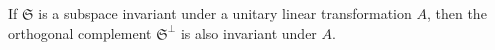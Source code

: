If $\mathfrak{S}$ is a subspace invariant under a unitary linear transformation $A$, then the orthogonal complement $\mathfrak{S}^{\perp}$ is also invariant under $A$.
